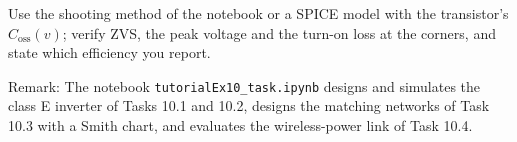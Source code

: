 
\begin{solutionblock}
	Use the shooting method of the notebook or a SPICE model with the transistor's $C_\mathrm{oss}(v)$; verify ZVS, the peak voltage and the turn-on loss at the corners, and state which efficiency you report.
\end{solutionblock}

\vspace{0.5cm}
Remark: The notebook \texttt{tutorialEx10\_task.ipynb} designs and simulates the class E inverter of Tasks 10.1 and 10.2, designs the matching networks of Task 10.3 with a Smith chart, and evaluates the wireless-power link of Task 10.4.
